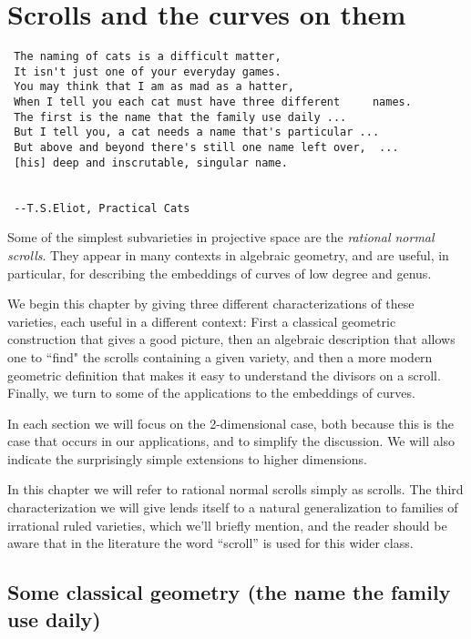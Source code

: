 

\chapter{Scrolls and the curves on them}
\label{ScrollsChapter}

\begin{verbatim}
 The naming of cats is a difficult matter,
 It isn't just one of your everyday games.
 You may think that I am as mad as a hatter,
 When I tell you each cat must have three different 	names.
 The first is the name that the family use daily ...
 But I tell you, a cat needs a name that's particular ...
 But above and beyond there's still one name left over,  ...
 [his] deep and inscrutable, singular name.

 
 --T.S.Eliot, Practical Cats
\end{verbatim}

Some of the simplest subvarieties in projective space are the \emph{rational normal scrolls}. They appear in many contexts in algebraic geometry, and are useful, in particular, for describing the embeddings of curves of low degree and genus. 

We begin this chapter by giving three different characterizations of these varieties, each useful in a different context: First a classical geometric construction that gives a good picture, then an algebraic description that allows one to ``find" the scrolls containing a given variety, and then a more modern geometric definition that makes it easy to understand the divisors on a scroll. Finally, we turn to some of the applications to the embeddings of curves.

In each section we will focus on the 2-dimensional case, both because this is the case that occurs in our applications, and to simplify the discussion. We will also indicate the surprisingly simple extensions to higher dimensions.

In this chapter we will refer to rational normal scrolls simply as scrolls. The third characterization we will give lends itself to a natural generalization to families of irrational ruled varieties, which we'll briefly mention, and the reader should be aware that in the literature the word ``scroll'' is used for this wider class.

\section{Some classical geometry (the name the family use daily)}

